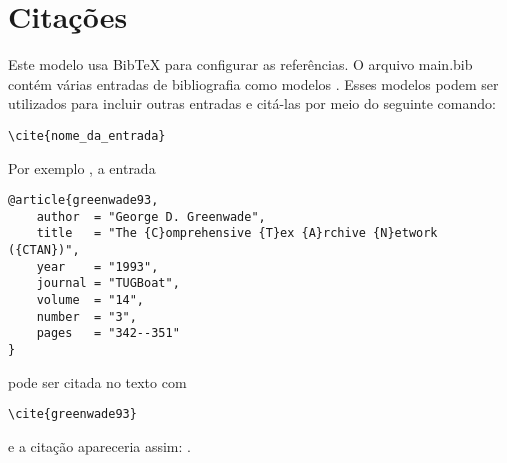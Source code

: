 \chapter{Citações}

\thispagestyle{empty} 

Este modelo usa BibTeX para configurar as referências. O arquivo main.bib contém várias entradas de bibliografia como modelos \cite{article,book,booklet,inbook}. Esses modelos podem ser utilizados para incluir outras entradas e citá-las por meio do seguinte comando:
\begin{verbatim}
\cite{nome_da_entrada}
\end{verbatim}

Por exemplo , a entrada
\verbatimfont{\small}
\begin{verbatim}
@article{greenwade93,
    author  = "George D. Greenwade",
    title   = "The {C}omprehensive {T}ex {A}rchive {N}etwork ({CTAN})",
    year    = "1993",
    journal = "TUGBoat",
    volume  = "14",
    number  = "3",
    pages   = "342--351"
}
\end{verbatim}
\verbatimfont{\normalfont}
pode ser citada no texto com
\begin{verbatim}
\cite{greenwade93}
\end{verbatim}
e a citação apareceria assim: \cite{greenwade93}.

